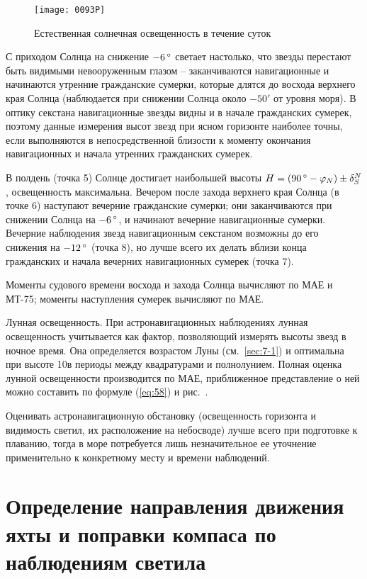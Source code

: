 \begin{figure*}[!htb]
  \centering
  \texttt{[image: 0093P]}
  \caption{Естественная солнечная освещенность в течение суток}
  \label{fig:93}
\end{figure*}

С приходом Солнца на снижение $-6\,^\circ$ светает настолько, что звезды перестают быть видимыми невооруженным глазом \--- заканчиваются навигационные и начинаются утренние гражданские сумерки, которые длятся до восхода верхнего края Солнца (наблюдается при снижении Солнца около $-50'$ от уровня моря). В оптику секстана навигационные звезды видны и в начале гражданских сумерек, поэтому данные измерения высот звезд при ясном горизонте наиболее точны, если выполняются в непосредственной близости к моменту окончания навигационных и начала утренних гражданских сумерек.

В полдень (точка 5) Солнце достигает наибольшей высоты $H = (90\,^\circ - \varphi_N) \pm \delta^N_S$, освещенность максимальна. Вечером после захода верхнего края Солнца (в точке 6) наступают вечерние гражданские сумерки; они заканчиваются при снижении Солнца на $-6\,^\circ$, и начинают вечерние навигационные сумерки. Вечерние наблюдения звезд навигационным секстаном возможны до его снижения на $-12\,^\circ$ (точка 8), но лучше всего их делать вблизи конца гражданских и начала вечерних навигационных сумерек (точка 7).

Моменты судового времени восхода и захода Солнца вычисляют по МАЕ и МТ-75; моменты наступления сумерек вычисляют по МАЕ.

Лунная освещенность. При астронавигационных наблюдениях лунная освещенность учитывается как фактор, позволяющий измерять высоты звезд в ночное время. Она определяется возрастом Луны (см.~\ref{sec:7-1}) и оптимальна при высоте 10\gr в периоды между квадратурами и полнолунием. Полная оценка лунной освещенности производится по МАЕ, приближенное представление о ней можно составить по формуле (\ref{eq:58}) и рис.~.

Оценивать астронавигационную обстановку (освещенность горизонта и видимость светил, их расположение на небосводе) лучше всего при подготовке к плаванию, тогда в море потребуется лишь незначительное ее уточнение применительно к конкретному месту и времени наблюдений.

\section{Определение направления движения яхты и поправки компаса по наблюдениям светила}\label{sec:7-4}

